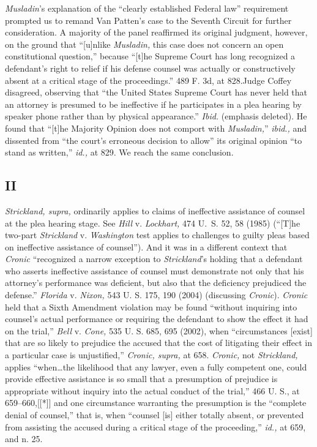  \emph{Musladin}'s explanation of the ``clearly established Federal law'' requirement prompted us to remand Van Patten's case to the Seventh Circuit for further consideration. A majority of the panel reaffirmed its original judgment, however, on the ground that ``[u]nlike \emph{Musladin,} this case does not concern an open constitutional question,'' because ``[t]he Supreme Court has long recognized a defendant's right to relief if his defense counsel was actually or constructively absent at a critical stage of the proceedings.'' 489 F. 3d, at 828.\newpage Judge Coffey disagreed, observing that ``the United States Supreme Court has never held that an attorney is presumed to be ineffective if he participates in a plea hearing by speaker phone rather than by physical appearance.'' \emph{Ibid.} (emphasis deleted). He found that ``[t]he Majority Opinion does not comport with \emph{Musladin,}'' \emph{ibid}.\emph{,} and dissented from ``the court's erroneous decision to allow'' its original opinion ``to stand as written,'' \emph{id.,} at 829. We reach the same conclusion.

\subsection{II}

  \emph{Strickland, supra,} ordinarily applies to claims of ineffective assistance of counsel at the plea hearing stage. See \emph{Hill} v. \emph{Lockhart,} 474 U.~S. 52, 58 (1985) (``[T]he two-part \emph{Strickland} v. \emph{Washington} test applies to challenges to guilty pleas based on ineffective assistance of counsel''). And it was in a different context that \emph{Cronic} ``recognized a narrow exception to \emph{Strickland}'s holding that a defendant who asserts ineffective assistance of counsel must demonstrate not only that his attorney's performance was deficient, but also that the deficiency prejudiced the defense.'' \emph{Florida} v. \emph{Nixon,} 543 U. S. 175, 190 (2004) (discussing \emph{Cronic}). \emph{Cronic} held that a Sixth Amendment violation may be found ``without inquiring into counsel's actual performance or requiring the defendant to show the effect it had on the trial,'' \emph{Bell} v. \emph{Cone,} 535 U. S. 685, 695 (2002), when ``circumstances [exist] that are so likely to prejudice the accused that the cost of litigating their effect in a particular case is unjustified,'' \emph{Cronic, supra,} at 658. \emph{Cronic,} not \emph{Strickland,} applies ``when\dots the likelihood that any lawyer, even a fully competent one, could provide effective assistance is so small that a presumption of prejudice is appropriate without inquiry into the actual conduct of the trial,'' 466 U. S., at 659--660,[[*]] and \newpage  one circumstance warranting the presumption is the ``complete denial of counsel,'' that is, when ``counsel [is] either totally absent, or prevented from assisting the accused during a critical stage of the proceeding,'' \emph{id.,} at 659, and n. 25.

